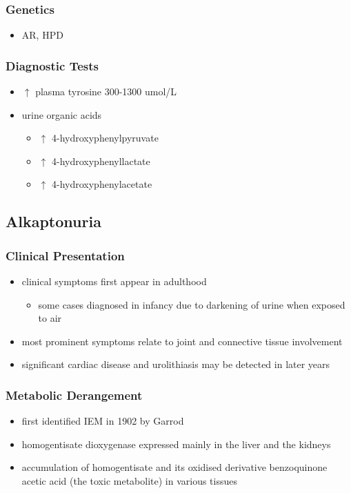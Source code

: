 \documentclass{scrartcl}
\begin{document}
\subsubsection{Genetics}
\label{sec:org3c2afd9}
\begin{itemize}
\item AR, HPD
\end{itemize}
\subsubsection{Diagnostic Tests}
\label{sec:orgd82ac32}
\begin{itemize}
\item \(\uparrow\) plasma tyrosine 300-1300 umol/L
\item urine organic acids
\begin{itemize}
\item \(\uparrow\) 4-hydroxyphenylpyruvate
\item \(\uparrow\) 4-hydroxyphenyllactate
\item \(\uparrow\) 4-hydroxyphenylacetate
\end{itemize}
\end{itemize}

\subsection{Alkaptonuria}
\label{sec:org4c6c288}
\subsubsection{Clinical Presentation}
\label{sec:org768d53d}
\begin{itemize}
\item clinical symptoms first appear in adulthood
\begin{itemize}
\item some cases diagnosed in infancy due to darkening of urine when
exposed to air
\end{itemize}
\item most prominent symptoms relate to joint and connective tissue involvement
\item significant cardiac disease and urolithiasis may be detected in later years
\end{itemize}
\subsubsection{Metabolic Derangement}
\label{sec:org33963c7}
\begin{itemize}
\item first identified IEM in 1902 by Garrod
\item homogentisate dioxygenase expressed mainly in the liver and the
kidneys
\end{itemize}
\begin{itemize}
\item accumulation of homogentisate and its oxidised derivative
benzoquinone acetic acid (the toxic metabolite) in various tissues
\end{itemize}
\end{document}
